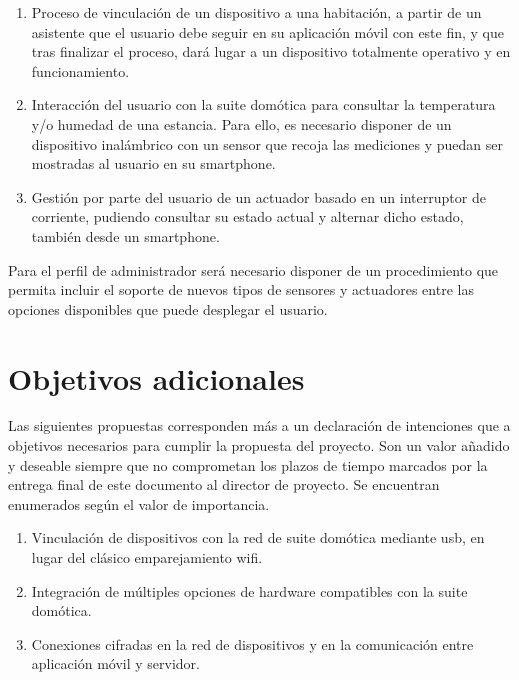 \begin{enumerate}

    \item Proceso de vinculación de un dispositivo a una habitación, a partir de un asistente que el usuario debe seguir en su aplicación móvil con este fin, y que tras finalizar el proceso, dará lugar a un dispositivo totalmente operativo y en funcionamiento.
    
    \item Interacción del usuario con la suite domótica para consultar la temperatura y/o humedad de una estancia. Para ello, es necesario disponer de un dispositivo inalámbrico con un sensor que recoja las mediciones y puedan ser mostradas al usuario en su smartphone.
    
    \item Gestión por parte del usuario de un actuador basado en un interruptor de corriente, pudiendo consultar su estado actual y alternar dicho estado, también desde un smartphone.

\end{enumerate}

Para el perfil de administrador será necesario disponer de un procedimiento que permita incluir el soporte de nuevos tipos de sensores y actuadores entre las opciones disponibles que puede desplegar el usuario.

\section{Objetivos adicionales}
\label{ch:Capitulo3.2}

Las siguientes propuestas corresponden más a un declaración de intenciones que a objetivos necesarios para cumplir la propuesta del proyecto. Son un valor añadido y deseable siempre que no comprometan los plazos de tiempo marcados por la entrega final de este documento al director de proyecto. Se encuentran enumerados según el valor de importancia.

\begin{enumerate}

  \item Vinculación de dispositivos con la red de suite domótica mediante \gls{usb}, en lugar del clásico emparejamiento \gls{wifi}.

  \item Integración de múltiples opciones de hardware compatibles con la suite domótica.

  \item Conexiones cifradas en la red de dispositivos y en la comunicación entre aplicación móvil y servidor.

\end{enumerate}
